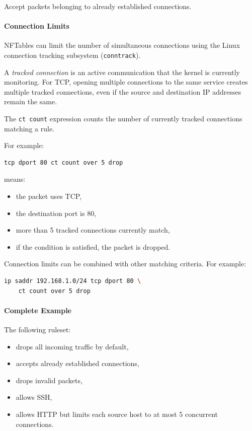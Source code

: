 Accept packets belonging to already established connections.

\paragraph{Connection Limits}

NFTables can limit the number of simultaneous connections using the Linux connection tracking subsystem (\texttt{conntrack}).

A \emph{tracked connection} is an active communication that the kernel is currently monitoring. For TCP, opening multiple connections to the same service creates multiple tracked connections, even if the source and destination IP addresses remain the same.

The \texttt{ct count} expression counts the number of currently tracked connections matching a rule.

For example:
\begin{lstlisting}[language=bash]
tcp dport 80 ct count over 5 drop
\end{lstlisting}


means:

\begin{itemize}
    \item the packet uses TCP,
    \item the destination port is 80,
    \item more than 5 tracked connections currently match,
    \item if the condition is satisfied, the packet is dropped.
\end{itemize}


Connection limits can be combined with other matching criteria. For example:

\begin{lstlisting}[language=bash]
ip saddr 192.168.1.0/24 tcp dport 80 \
    ct count over 5 drop
\end{lstlisting}


\paragraph{Complete Example}

The following ruleset:

\begin{itemize}
    \item drops all incoming traffic by default,
    \item accepts already established connections,
    \item drops invalid packets,
    \item allows SSH,
    \item allows HTTP but limits each source host to at most 5 concurrent connections.
\end{itemize}

